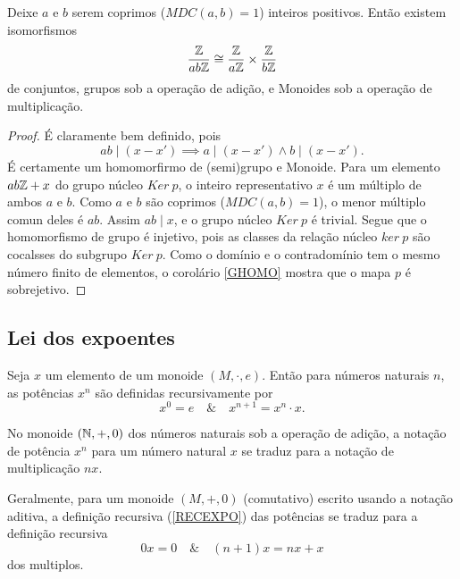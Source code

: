 \begin{theorem}
  Deixe $a$ e $b$ serem coprimos ($MDC(a,b) = 1$) inteiros positivos. Então existem isomorfismos $$\dfrac{\mathbb{Z}}{ab\mathbb{Z}} \cong \dfrac{\mathbb{Z}}{a\mathbb{Z}} \times \dfrac{\mathbb{Z}}{b\mathbb{Z}}$$ de conjuntos, grupos sob a operação de adição, e Monoides sob a operação de multiplicação.
  \begin{proof}
    É claramente bem definido, pois $$ab \mid (x - x') \implies a \mid (x - x') \wedge b \mid (x - x').$$ É certamente um homomorfirmo de (semi)grupo e Monoide. Para um elemento $ab\mathbb{Z} + x$ do grupo núcleo $Ker\ p$, o inteiro representativo $x$ é um múltiplo de ambos $a$ e $b$. Como $a$ e $b$ são coprimos ($MDC(a,b) = 1$), o menor múltiplo comun deles é $ab$. Assim $ab \mid x$, e o grupo núcleo $Ker\ p$ é trivial. Segue que o homomorfismo de grupo é injetivo, pois as classes da relação núcleo $ker\ p$ são cocalsses do subgrupo $Ker\ p$. Como o domínio e o contradomínio tem o mesmo número finito de elementos, o corolário \ref{GHOMO} mostra que o mapa $p$ é sobrejetivo.
  \end{proof}
\end{theorem}

\subsection{Lei dos expoentes}
Seja $x$ um elemento de um monoide $(M, \cdot, e)$. Então para números naturais $n$, as potências $x^n$ são definidas recursivamente por
\begin{equation}\label{RECEXPO}
  x^{0} = e\quad \&\quad x^{n+1}=x^{n} \cdot x.  
\end{equation}

No monoide $(\mathbb{N} , +, 0)$ dos números naturais sob a operação de adição, a notação de potência $x^{n}$ para um número natural $x$ se traduz para a notação de multiplicação $nx$.

Geralmente, para um monoide $(M, +, 0)$ (comutativo) escrito usando a notação aditiva, a definição recursiva (\ref{RECEXPO}) das potências se traduz para a definição recursiva
$$0x = 0\quad \&\quad (n+1)x = nx+x$$
dos multiplos.

